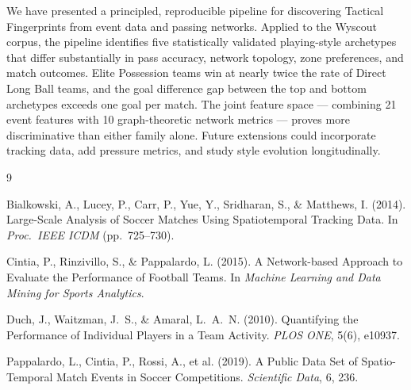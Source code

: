 \documentclass[runningheads]{llncs}
\begin{document}
We have presented a principled, reproducible pipeline for discovering Tactical Fingerprints from event data and passing networks. Applied to the Wyscout corpus, the pipeline identifies five statistically validated playing-style archetypes that differ substantially in pass accuracy, network topology, zone preferences, and match outcomes. Elite Possession teams win at nearly twice the rate of Direct Long Ball teams, and the goal difference gap between the top and bottom archetypes exceeds one goal per match. The joint feature space --- combining 21 event features with 10 graph-theoretic network metrics --- proves more discriminative than either family alone. Future extensions could incorporate tracking data, add pressure metrics, and study style evolution longitudinally.

%
%
\begin{thebibliography}{9}

Bialkowski, A., Lucey, P., Carr, P., Yue, Y., Sridharan, S., \& Matthews, I. (2014).
Large-Scale Analysis of Soccer Matches Using Spatiotemporal Tracking Data.
In \textit{Proc.\ IEEE ICDM} (pp.\ 725--730).

Cintia, P., Rinzivillo, S., \& Pappalardo, L. (2015).
A Network-based Approach to Evaluate the Performance of Football Teams.
In \textit{Machine Learning and Data Mining for Sports Analytics}.

Duch, J., Waitzman, J.~S., \& Amaral, L.~A.~N. (2010).
Quantifying the Performance of Individual Players in a Team Activity.
\textit{PLOS ONE}, 5(6), e10937.

Pappalardo, L., Cintia, P., Rossi, A., et al. (2019).
A Public Data Set of Spatio-Temporal Match Events in Soccer Competitions.
\textit{Scientific Data}, 6, 236.

\end{thebibliography}
\end{document}
